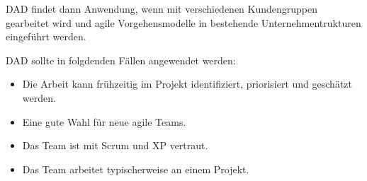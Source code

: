 DAD findet dann Anwendung, wenn mit verschiedenen Kundengruppen gearbeitet wird und agile Vorgehensmodelle in bestehende Unternehmentrukturen eingeführt werden.

\pagebreak
DAD sollte in folgdenden Fällen angewendet werden:

\begin{itemize}
	\item Die Arbeit kann frühzeitig im Projekt identifiziert, priorisiert und geschätzt werden.
	\item Eine gute Wahl für neue agile Teams.
	\item Das Team ist mit Scrum und XP vertraut.
	\item Das Team arbeitet typischerweise an einem Projekt.
\end{itemize}

